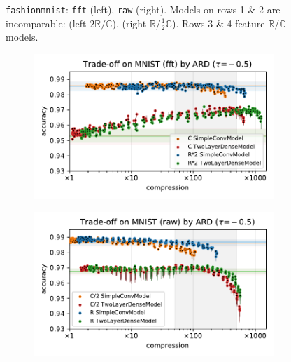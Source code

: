\documentclass[a4paper,10pt,onecolumn]{article}
\newcommand{\real}{\mathbb{R}}
\newcommand{\cplx}{\mathbb{C}}
\begin{document}
\begin{figure}[b]
\begin{subfigure}[b]{0.5\columnwidth}
  \end{subfigure}
  \caption{%
    \texttt{fashionmnist}:
      \texttt{fft} (left), \texttt{raw} (right).
      Models on rows 1 \& 2 are incomparable: (left $2\real / \cplx$), (right $\real / \tfrac12\cplx$).
      Rows 3 \& 4 feature $\real / \cplx$ models.
  }
\end{figure}

\begin{figure}[b]
  \centering
  \begin{subfigure}[b]{0.5\columnwidth}
    \centering
    \includegraphics[width=\columnwidth]{figure__mnist-like__trade-off/appendix__cmp__ARD__mnist__fft__-0.5.pdf}
  \end{subfigure}%
  \begin{subfigure}[b]{0.5\columnwidth}
    \centering
    \includegraphics[width=\columnwidth]{figure__mnist-like__trade-off/appendix__cmp__ARD__mnist__raw__-0.5.pdf}
  \end{subfigure} \\%

\end{figure}
\end{document}
